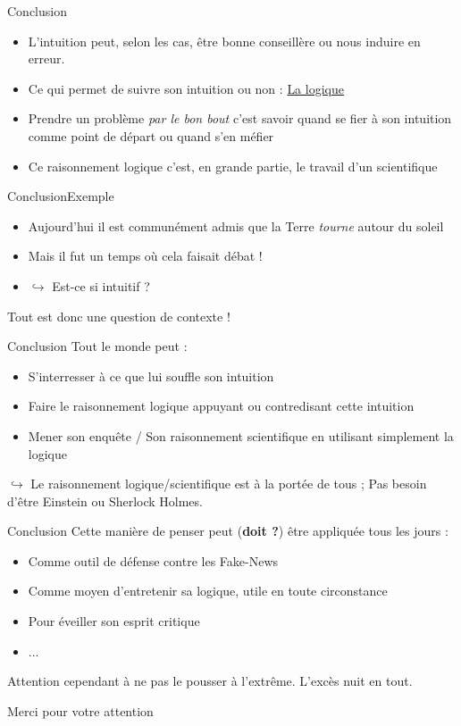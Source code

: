 \documentclass[11pt]{beamer}
\begin{document}
\begin{frame}{Conclusion}
\begin{itemize}
	\item 	L'intuition peut, selon les cas, être bonne conseillère ou nous induire en erreur. \pause
	\item Ce qui permet de suivre son intuition ou non : \underline{La logique} \pause 
	\item Prendre un problème \textit{par le bon bout} c'est savoir quand se fier à son intuition comme point de départ ou quand s'en méfier \pause 
	\item Ce raisonnement logique c'est, en grande partie, le travail d'un scientifique
\end{itemize}
\end{frame}
\begin{frame}{Conclusion}{Exemple}

	\begin{itemize}
		\item Aujourd'hui il est communément admis que la Terre \textit{tourne} autour du soleil \pause
		\item Mais il fut un temps où cela faisait débat ! \pause
		\item[] $\hookrightarrow$ Est-ce si intuitif ? \pause 
		
	\end{itemize}
\vspace{2cm} Tout est donc une question de contexte ! 
\end{frame}
\begin{frame}{Conclusion}
Tout le monde peut : 
\begin{itemize}
	\item S'interresser à ce que lui souffle son intuition \pause
	\item Faire le raisonnement logique appuyant ou contredisant cette intuition \pause 
	\item Mener son enquête / Son raisonnement scientifique en utilisant simplement la logique
\end{itemize}
\pause $\hookrightarrow$ Le raisonnement logique/scientifique est à la portée de tous ; Pas besoin d'être Einstein ou Sherlock Holmes.
\end{frame} 
\begin{frame}{Conclusion}
	Cette manière de penser peut (\textbf{doit ?}) être appliquée tous les jours \pause : 
	\begin{itemize}
		\item Comme outil de défense contre les Fake-News
		\item Comme moyen d'entretenir sa logique, utile en toute circonstance
		\item Pour éveiller son esprit critique
		\item ...
	\end{itemize}

\pause Attention cependant à ne pas le pousser à l'extrême. L'excès nuit en tout.
\end{frame}
\begin{frame}
	\begin{center}
		\Huge{Merci pour votre attention}
	\end{center}
\end{frame}
\end{document}
